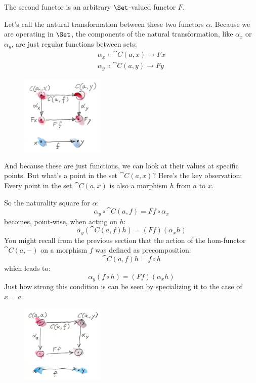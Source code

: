 The second functor is an arbitrary $\Set$-valued functor
$F$.

Let's call the natural transformation between these two functors
$\alpha$. Because we are operating in $\Set$, the components of
the natural transformation, like $\alpha_x$ or $\alpha_y$, are just
regular functions between sets:
\begin{gather*}
\alpha_x \Colon \cat{C}(a, x) \to F x \\
\alpha_y \Colon \cat{C}(a, y) \to F y
\end{gather*}

\begin{figure}[H]
\centering
\includegraphics[width=40mm]{images/yoneda1.png}
\end{figure}

\noindent
And because these are just functions, we can look at their values at
specific points. But what's a point in the set $\cat{C}(a, x)$? Here's
the key observation: Every point in the set $\cat{C}(a, x)$ is also a
morphism $h$ from $a$ to $x$.

So the naturality square for $\alpha$:
\[\alpha_y \circ \cat{C}(a, f) = F f \circ \alpha_x\]
becomes, point-wise, when acting on $h$:
\[\alpha_y (\cat{C}(a, f) h) = (F f) (\alpha_x h)\]
You might recall from the previous section that the action of the
hom-functor $\cat{C}(a,-)$ on a morphism $f$ was defined as
precomposition:
\[\cat{C}(a, f) h = f \circ h\]
which leads to:
\[\alpha_y (f \circ h) = (F f) (\alpha_x h)\]
Just how strong this condition is can be seen by specializing it to the
case of $x = a$.

\begin{figure}[H]
\centering
\includegraphics[width=40mm]{images/yoneda2.png}
\end{figure}

